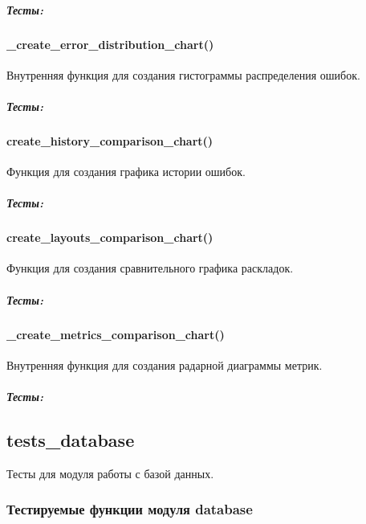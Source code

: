 \documentclass[a4paper,11pt,russian,openany,oneside]{sphinxmanual}
\begin{document}
\subparagraph{Тесты:}
\label{\detokenize{tests_module:id6}}

\paragraph{\_create\_error\_distribution\_chart()}
\label{\detokenize{tests_module:create-error-distribution-chart}}
\sphinxAtStartPar
Внутренняя функция для создания гистограммы распределения ошибок.


\subparagraph{Тесты:}
\label{\detokenize{tests_module:id7}}

\paragraph{create\_history\_comparison\_chart()}
\label{\detokenize{tests_module:create-history-comparison-chart}}
\sphinxAtStartPar
Функция для создания графика истории ошибок.


\subparagraph{Тесты:}
\label{\detokenize{tests_module:id8}}

\paragraph{create\_layouts\_comparison\_chart()}
\label{\detokenize{tests_module:create-layouts-comparison-chart}}
\sphinxAtStartPar
Функция для создания сравнительного графика раскладок.


\subparagraph{Тесты:}
\label{\detokenize{tests_module:id9}}

\paragraph{\_create\_metrics\_comparison\_chart()}
\label{\detokenize{tests_module:create-metrics-comparison-chart}}
\sphinxAtStartPar
Внутренняя функция для создания радарной диаграммы метрик.


\subparagraph{Тесты:}
\label{\detokenize{tests_module:id10}}

\subsection{tests\_database}
\label{\detokenize{tests_module:tests-database}}
\sphinxAtStartPar
Тесты для модуля работы с базой данных.


\subsubsection{Тестируемые функции модуля database}
\label{\detokenize{tests_module:database}}
\end{document}
